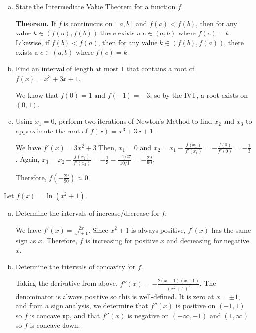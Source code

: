\begin{prob}
  \begin{enumerate}[(a)]
    \item State the Intermediate Value Theorem for a function $f$.

          \textbf{Theorem.} If $f$ is continuous on $[a,b]$ and $f(a) < f(b)$,
          then for any value $k\in(f(a),f(b))$ there exists a $c\in(a,b)$ where $f(c) = k$.
          Likewise, if $f(b) < f(a)$, then for any value $k\in(f(b),f(a))$,
          there exists a $c\in(a,b)$ where $f(c)=k$.

    \item Find an interval of length at most 1 that contains a root of $f(x) = x^3 + 3x + 1$.
          \begin{sol}
            We know that $f(0) = 1$ and $f(-1) = -3$, so by the IVT, a root exists on $(0,1)$.
          \end{sol}

    \item Using $x_1 = 0$, perform two iterations of Newton's Method to find $x_2$ and $x_3$
          to approximate the root of $f(x) = x^3 + 3x + 1$.
          \begin{sol}
            We have $f'(x) = 3x^2 + 3$
            Then, $x_1 = 0$ and $x_2 = x_1 - \frac{f(x_1)}{f'(x_1)} = -\frac{f(0)}{f'(0)} = -\frac13$.
            Again, $x_3 = x_2 - \frac{f(x_2)}{f'(x_2)} = -\frac13 - \frac{-1/27}{10/3} = -\frac{29}{90}$.

            Therefore, $f(-\frac{29}{90}) \approx 0$.
          \end{sol}
  \end{enumerate}
\end{prob}

\begin{prob}
  Let $f(x) = \ln(x^2+1)$.
  \begin{enumerate}[(a)]
    \item Determine the intervals of increase/decrease for $f$.
          \begin{sol}
            We have $f'(x) = \frac{2x}{x^2+1}$.
            Since $x^2+1$ is always positive, $f'(x)$ has the same sign as $x$.
            Therefore, $f$ is increasing for positive $x$ and decreasing for negative $x$.
          \end{sol}
    \item Determine the intervals of concavity for $f$.
          \begin{sol}
            Taking the derivative from above, $f''(x) = -\frac{2(x-1)(x+1)}{(x^2+1)^2}$.
            The denominator is always positive so this is well-defined.
            It is zero at $x = \pm 1$, and from a sign analysis,
            we determine that $f''(x)$ is positive on $(-1,1)$ so $f$ is concave up,
            and that $f''(x)$ is negative on $(-\infty,-1)$ and $(1,\infty)$ so $f$ is concave down.
          \end{sol}
  \end{enumerate}
\end{prob}

